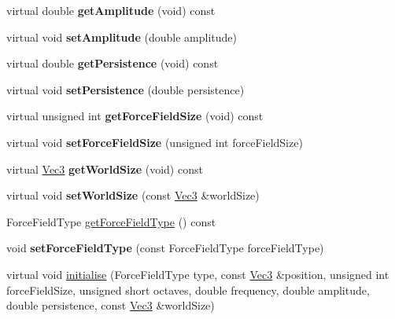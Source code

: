 \begin{DoxyCompactItemize}
virtual double {\bfseries get\+Amplitude} (void) const
\item 
\mbox{\label{classPUForceField_a24e5d1dd9c3e419764be184c29c489e8}} 
virtual void {\bfseries set\+Amplitude} (double amplitude)
\item 
\mbox{\label{classPUForceField_af2119cae135207f1fb59b29143c6a016}} 
virtual double {\bfseries get\+Persistence} (void) const
\item 
\mbox{\label{classPUForceField_af59aefd5c996ade320dd9314a99ffee0}} 
virtual void {\bfseries set\+Persistence} (double persistence)
\item 
\mbox{\label{classPUForceField_adb703678741b4192012be8769098ddbb}} 
virtual unsigned int {\bfseries get\+Force\+Field\+Size} (void) const
\item 
\mbox{\label{classPUForceField_ae213478822c9b159e4e4651d75efb80f}} 
virtual void {\bfseries set\+Force\+Field\+Size} (unsigned int force\+Field\+Size)
\item 
\mbox{\label{classPUForceField_ab8b69fe36dafa9f8df953436e92d4030}} 
virtual \hyperlink{classVec3}{Vec3} {\bfseries get\+World\+Size} (void) const
\item 
\mbox{\label{classPUForceField_a94470b3fa18bd779f2ac0f747e4173ae}} 
virtual void {\bfseries set\+World\+Size} (const \hyperlink{classVec3}{Vec3} \&world\+Size)
\item 
Force\+Field\+Type \hyperlink{classPUForceField_a3d4c0662978c820f91bf77751210b1e8}{get\+Force\+Field\+Type} () const
\item 
\mbox{\label{classPUForceField_a512325199291409005495a6729048a83}} 
void {\bfseries set\+Force\+Field\+Type} (const Force\+Field\+Type force\+Field\+Type)
\item 
virtual void \hyperlink{classPUForceField_aca08e441cd22af729ec4f7bcf562607c}{initialise} (Force\+Field\+Type type, const \hyperlink{classVec3}{Vec3} \&position, unsigned int force\+Field\+Size, unsigned short octaves, double frequency, double amplitude, double persistence, const \hyperlink{classVec3}{Vec3} \&world\+Size)

\end{DoxyCompactItemize}
